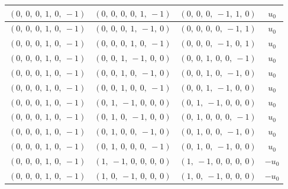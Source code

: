 \documentclass[11pt]{article}
\theoremstyle{definition}
\begin{document}
\begin{longtable}{|l|l|l|c|}
    \hline
    $\left( 0, \  0, \  0, \  1, \  0, \  -1\right)$ & $\left( 0, \  0, \  0, \  0, \  1, \  -1\right)$ & $\left( 0, \  0, \  0, \  -1, \  1, \  0\right)$ & $u_{0}$ \\
    \hline
    $\left( 0, \  0, \  0, \  1, \  0, \  -1\right)$ & $\left( 0, \  0, \  0, \  1, \  -1, \  0\right)$ & $\left( 0, \  0, \  0, \  0, \  -1, \  1\right)$ & $u_{0}$ \\
    \hline
    $\left( 0, \  0, \  0, \  1, \  0, \  -1\right)$ & $\left( 0, \  0, \  0, \  1, \  0, \  -1\right)$ & $\left( 0, \  0, \  0, \  -1, \  0, \  1\right)$ & $u_{0}$ \\
    \hline
    $\left( 0, \  0, \  0, \  1, \  0, \  -1\right)$ & $\left( 0, \  0, \  1, \  -1, \  0, \  0\right)$ & $\left( 0, \  0, \  1, \  0, \  0, \  -1\right)$ & $u_{0}$ \\
    \hline
    $\left( 0, \  0, \  0, \  1, \  0, \  -1\right)$ & $\left( 0, \  0, \  1, \  0, \  -1, \  0\right)$ & $\left( 0, \  0, \  1, \  0, \  -1, \  0\right)$ & $u_{0}$ \\
    \hline
    $\left( 0, \  0, \  0, \  1, \  0, \  -1\right)$ & $\left( 0, \  0, \  1, \  0, \  0, \  -1\right)$ & $\left( 0, \  0, \  1, \  -1, \  0, \  0\right)$ & $u_{0}$ \\
    \hline
    $\left( 0, \  0, \  0, \  1, \  0, \  -1\right)$ & $\left( 0, \  1, \  -1, \  0, \  0, \  0\right)$ & $\left( 0, \  1, \  -1, \  0, \  0, \  0\right)$ & $u_{0}$ \\
    \hline
    $\left( 0, \  0, \  0, \  1, \  0, \  -1\right)$ & $\left( 0, \  1, \  0, \  -1, \  0, \  0\right)$ & $\left( 0, \  1, \  0, \  0, \  0, \  -1\right)$ & $u_{0}$ \\
    \hline
    $\left( 0, \  0, \  0, \  1, \  0, \  -1\right)$ & $\left( 0, \  1, \  0, \  0, \  -1, \  0\right)$ & $\left( 0, \  1, \  0, \  0, \  -1, \  0\right)$ & $u_{0}$ \\
    \hline
    $\left( 0, \  0, \  0, \  1, \  0, \  -1\right)$ & $\left( 0, \  1, \  0, \  0, \  0, \  -1\right)$ & $\left( 0, \  1, \  0, \  -1, \  0, \  0\right)$ & $u_{0}$ \\
    \hline
    $\left( 0, \  0, \  0, \  1, \  0, \  -1\right)$ & $\left( 1, \  -1, \  0, \  0, \  0, \  0\right)$ & $\left( 1, \  -1, \  0, \  0, \  0, \  0\right)$ & $- u_{0}$ \\
    \hline
    $\left( 0, \  0, \  0, \  1, \  0, \  -1\right)$ & $\left( 1, \  0, \  -1, \  0, \  0, \  0\right)$ & $\left( 1, \  0, \  -1, \  0, \  0, \  0\right)$ & $- u_{0}$ \\

\end{longtable}
\end{document}
